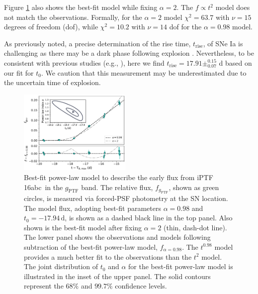 \documentclass[twocolumn]{aastex61}
\newcommand{\abc}{iPTF\,16abc}
\begin{document}
Figure \ref{fig:early_lc_fit} also shows the best-fit model while fixing $\alpha = 2$. The $f \propto t^2$ model does not match the observations. Formally, for the $\alpha = 2$ model $\chi^2 = 63.7$ with $\nu = 15$ degrees of freedom (dof), while $\chi^2 = 10.2$ with $\nu = 14$ dof for the $\alpha = 0.98$ model.

As previously noted, a precise determination of the rise time, $t_\mathrm{rise}$, of SNe Ia is challenging as there may be a dark phase following explosion \citep{2014ApJ...784...85P}. Nevertheless, to be consistent with previous studies (e.g., \citealt{2011MNRAS.416.2607G}), here we find $t_\mathrm{rise} = 17.91\pm _{0.07}^{0.15}$ d based on our fit for $t_0$. We caution that this measurement may be underestimated due to the uncertain time of explosion. 

\begin{figure}[!htb]
  \centering
  \includegraphics[width=0.48\textwidth]{early_lc.pdf}
  \caption{Best-fit power-law model to describe the early flux 
  from \abc\ in the $g_\mathrm{PTF}$ band. The relative flux, 
  $f_{g_\mathrm{PTF}}$, shown as green circles, is measured via 
  forced-PSF photometry at the SN location. The model flux, 
  adopting best-fit parameters $\alpha=0.98$ and 
  $t_0=-17.94\,\textrm{d}$, is shown as a dashed black line in the 
  top panel. Also shown is the best-fit model after fixing 
  $\alpha=2$ (thin, dash-dot line). 
  The lower panel shows the observations and models following 
  subtraction of the best-fit power-law model, $f_{\alpha = 0.98}$.
  The $t^{0.98}$ model provides a much better fit to the 
  observations than the $t^2$ model.  
  The joint distribution of $t_0$ and $\alpha$ for the best-fit 
  power-law model is illustrated in the inset of the upper panel. 
  The solid contours represent the $68\%$ and $99.7\%$ confidence 
  levels. 
  }
  \label{fig:early_lc_fit}
\end{figure}
\end{document}
